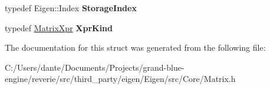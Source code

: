 \begin{DoxyCompactItemize}
typedef Eigen\+::\+Index {\bfseries Storage\+Index}
\item 
\mbox{\label{struct_eigen_1_1internal_1_1traits_3_01_matrix_3_01___scalar_00_01___rows_00_01___cols_00_01___o4c9772ffb3eee7280611af9a479b3583_a95750044bb96facbad2e7b54f6a5916a}} 
typedef \mbox{\hyperlink{struct_eigen_1_1_matrix_xpr}{Matrix\+Xpr}} {\bfseries Xpr\+Kind}
\end{DoxyCompactItemize}


The documentation for this struct was generated from the following file\+:\begin{DoxyCompactItemize}
\item 
C\+:/\+Users/dante/\+Documents/\+Projects/grand-\/blue-\/engine/reverie/src/third\+\_\+party/eigen/\+Eigen/src/\+Core/Matrix.\+h\end{DoxyCompactItemize}
